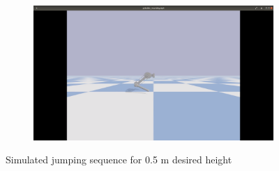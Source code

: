 \documentclass[onecolumn, letter paper]{report}
\begin{document}
\begin{figure}[htb!]
\begin{subfigure}{.24\textwidth}
    \end{subfigure}
    \begin{subfigure}{.24\textwidth}
    \includegraphics[width=\textwidth, trim={25cm 10cm 25cm 5cm}, clip]{figures/sim0.5m/s54.png}
    \end{subfigure}
    \caption{Simulated jumping sequence for 0.5 m desired height}
    \label{fig:simsequence5}
\end{figure}
\end{document}
